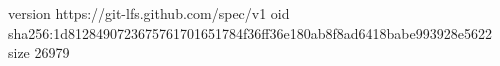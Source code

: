 version https://git-lfs.github.com/spec/v1
oid sha256:1d8128490723675761701651784f36ff36e180ab8f8ad6418babe993928e5622
size 26979
